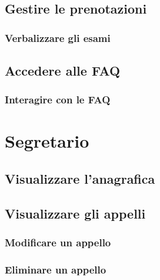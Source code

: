 \documentclass [a4paper,11pt]{book}
\begin{document}

\medskip

\subsection{Gestire le prenotazioni}


\subsubsection{Verbalizzare gli esami}

\medskip

\subsection{Accedere alle FAQ}


\subsubsection{Interagire con le FAQ}

\medskip
\medskip

\section{Segretario}

\subsection{Visualizzare l'anagrafica}

\medskip

\subsection{Visualizzare gli appelli}


\subsubsection{Modificare un appello}

\medskip

\subsubsection{Eliminare un appello}

\medskip
\end{document}
